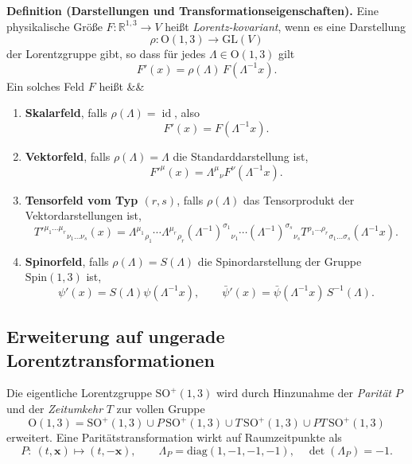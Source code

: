 \documentclass[10pt, letterpaper]{article}
\newcommand{\id}{\operatorname{id}}
\newcommand{\R}{\mathbb{R}}
\newcommand{\GL}{\mathrm{GL}}
\newcommand{\SO}{\mathrm{SO}}
\newcommand{\Spin}{\mathrm{Spin}}
\newcommand{\Ogroup}{\mathrm{O}}
\newenvironment{romanenum}[1][]
  {%
    \ifx&#1&
    \else
      \textbf{#1}\quad
    \fi
    \begin{enumerate}[label=\roman*)]
  }
  {%
    \end{enumerate}%
  }
\newenvironment{customTheorem}
  {\vspace{10pt}%
   \begin{mdframed}[
     backgroundcolor=gray!20,
     linewidth=0pt,
     innertopmargin=10pt,
     innerbottommargin=10pt,
     skipabove=\dimexpr\topsep+\ht\strutbox\relax,
     skipbelow=\topsep,
   ]}
  {\end{mdframed}
   \vspace{10pt}%
  }
\begin{document}
\begin{customTheorem}
\textbf{Definition (Darstellungen und Transformationseigenschaften).}
Eine physikalische Größe $F:\R^{1,3}\to V$ heißt \emph{Lorentz-kovariant}, wenn es eine Darstellung 
\[
\rho:\Ogroup(1,3)\longrightarrow \GL(V)
\]
der Lorentzgruppe gibt, so dass für jedes $\Lambda\in \Ogroup(1,3)$ gilt
\[
F'(x)=\rho(\Lambda)\,F(\Lambda^{-1}x).
\]
Ein solches Feld $F$ heißt
\begin{romanenum}
\item \textbf{Skalarfeld}, falls $\rho(\Lambda)=\id$, also
  \[
  F'(x)=F(\Lambda^{-1}x).
  \]
\item \textbf{Vektorfeld}, falls $\rho(\Lambda)=\Lambda$ die Standarddarstellung ist,
  \[
  F'^{\mu}(x)=\Lambda^{\mu}{}_{\nu}F^{\nu}(\Lambda^{-1}x).
  \]
\item \textbf{Tensorfeld vom Typ $(r,s)$}, falls $\rho(\Lambda)$ das Tensorprodukt der Vektordarstellungen ist,
  \[
  T'^{\mu_1\dots\mu_r}{}_{\nu_1\dots\nu_s}(x)
  =\Lambda^{\mu_1}{}_{\rho_1}\cdots\Lambda^{\mu_r}{}_{\rho_r}
   (\Lambda^{-1})^{\sigma_1}{}_{\nu_1}\cdots (\Lambda^{-1})^{\sigma_s}{}_{\nu_s}
   T^{\rho_1\dots\rho_r}{}_{\sigma_1\dots\sigma_s}(\Lambda^{-1}x).
  \]
\item \textbf{Spinorfeld}, falls $\rho(\Lambda)=S(\Lambda)$ die Spinordarstellung der Gruppe $\Spin(1,3)$ ist,
  \[
  \psi'(x)=S(\Lambda)\psi(\Lambda^{-1}x),
  \qquad
  \bar\psi'(x)=\bar\psi(\Lambda^{-1}x)\,S^{-1}(\Lambda).
  \]
\end{romanenum}
\end{customTheorem}

\subsection{Erweiterung auf ungerade Lorentztransformationen}

Die eigentliche Lorentzgruppe $\SO^+(1,3)$ wird durch Hinzunahme der \emph{Parität} $P$ und der \emph{Zeitumkehr} $T$ zur vollen Gruppe
\[
\Ogroup(1,3)=\SO^+(1,3)\cup P\,\SO^+(1,3)\cup T\,\SO^+(1,3)\cup PT\,\SO^+(1,3)
\]
erweitert. Eine Paritätstransformation wirkt auf Raumzeitpunkte als
\[
P:\ (t,\mathbf{x})\longmapsto (t,-\mathbf{x}),\qquad 
\Lambda_P=\mathrm{diag}(1,-1,-1,-1),\quad \det(\Lambda_P)=-1.
\]
\end{document}
